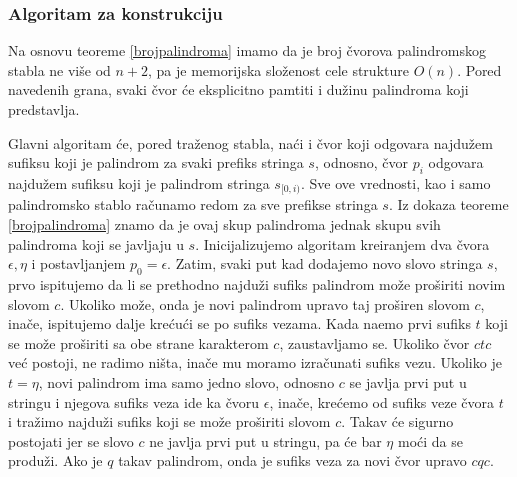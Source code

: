 \subsubsection{Algoritam za konstrukciju}

Na osnovu teoreme \ref{brojpalindroma} imamo da je broj \v cvorova palindromskog stabla ne vi\v se od $n+2$, pa je memorijska slo\v zenost cele strukture $O(n)$. Pored navedenih grana, svaki \v cvor \' ce eksplicitno pamtiti i du\v zinu palindroma koji predstavlja.

\noindent
\begin{minipage}[l]{\textwidth}

\end{minipage}

Glavni algoritam \' ce, pored tra\v zenog stabla, na\' ci i \v cvor koji odgovara najdu\v zem sufiksu koji je palindrom za svaki prefiks stringa $s$, odnosno, \v cvor $p_i$ odgovara najdu\v zem sufiksu koji je palindrom stringa $s_{[0,i)}$. Sve ove vrednosti, kao i samo palindromsko stablo ra\v cunamo redom za sve prefikse stringa $s$. Iz dokaza teoreme \ref{brojpalindroma} znamo da je ovaj skup palindroma jednak skupu svih palindroma koji se javljaju u $s$. Inicijalizujemo algoritam kreiranjem dva \v cvora $\epsilon, \eta$ i postavljanjem $p_0 = \epsilon$. Zatim, svaki put kad dodajemo novo slovo stringa $s$, prvo ispitujemo da li se prethodno najdu\v zi sufiks palindrom mo\v ze pro\v siriti novim slovom $c$. Ukoliko mo\v ze, onda je novi palindrom upravo taj pro\v siren slovom $c$, ina\v ce, ispitujemo dalje kre\' cu\' ci se po sufiks vezama. Kada na\dj emo prvi sufiks $t$ koji se mo\v ze pro\v siriti sa obe strane karakterom $c$, zaustavljamo se. Ukoliko \v cvor $ctc$ ve\' c postoji, ne radimo ni\v sta, ina\v ce mu moramo izra\v cunati sufiks vezu. Ukoliko je $t = \eta$, novi palindrom ima samo jedno slovo, odnosno $c$ se javlja prvi put u stringu i njegova sufiks veza ide ka \v cvoru $\epsilon$, ina\v ce, kre\' cemo od sufiks veze \v cvora $t$ i tra\v zimo najdu\v zi sufiks koji se mo\v ze pro\v siriti slovom $c$. Takav \' ce sigurno postojati jer se slovo $c$ ne javlja prvi put u stringu, pa \' ce bar $\eta$ mo\' ci da se produ\v zi. Ako je $q$ takav palindrom, onda je sufiks veza za novi \v cvor upravo $cqc$.

\noindent
\begin{minipage}[l]{\textwidth}

\end{minipage}

